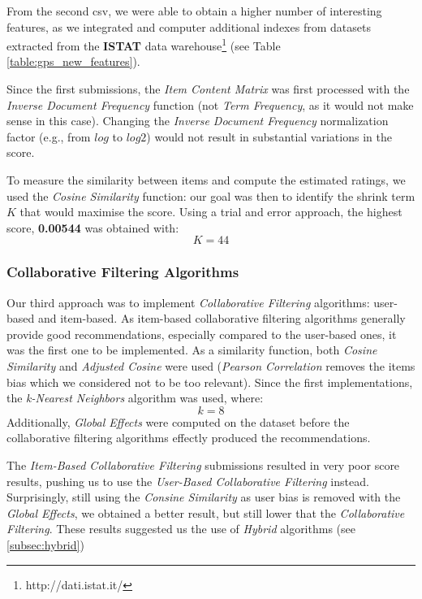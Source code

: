 \documentclass{acm_proc_article-sp}
\begin{document}
\newpage
From the second csv, we were able to obtain a higher number of interesting features, as we integrated and computer additional indexes from datasets extracted from the \textbf{ISTAT} data warehouse\footnote{http://dati.istat.it/}  (see Table \ref{table:gps_new_features}).



Since the first submissions, the \textit{Item Content Matrix} was first processed with the \textit{Inverse Document Frequency} function (not \textit{Term Frequency}, as it would not make sense in this case).
Changing the \textit{Inverse Document Frequency} normalization factor (e.g., from $log$ to $log2$) would not result in substantial variations in the score.

To measure the similarity between items and compute the estimated ratings, we used the \textit{Cosine Similarity} function: our goal was then to identify the shrink term $K$ that would maximise the score.
Using a trial and error approach, the highest score, \textbf{0.00544} was obtained with:\begin{equation}K=44\end{equation} 

\subsubsection{Collaborative Filtering Algorithms}
Our third approach was to implement \textit{Collaborative Filtering} algorithms: user-based and item-based.
As item-based collaborative filtering algorithms generally provide good recommendations, especially compared to the user-based ones, it was the first one to be implemented.
As a similarity function, both \textit{Cosine Similarity} and \textit{Adjusted Cosine} were used (\textit{Pearson Correlation} removes the items bias which we considered not to be too relevant).
Since the first implementations, the \textit{k-Nearest Neighbors} algorithm was used, where: 
\begin{equation}k=8\end{equation}
Additionally, \textit{Global Effects} were computed on the dataset before the collaborative filtering algorithms effectly produced the recommendations.

The \textit{Item-Based Collaborative Filtering} submissions resulted in very poor score results, pushing us to use the \textit{User-Based Collaborative Filtering} instead.
Surprisingly, still using the \textit{Consine Similarity} as user bias is removed with the \textit{Global Effects}, we obtained a better result, but still lower that the \textit{Collaborative Filtering}. 
These results suggested us the use of \textit{Hybrid} algorithms (see \ref{subsec:hybrid})
\end{document}
